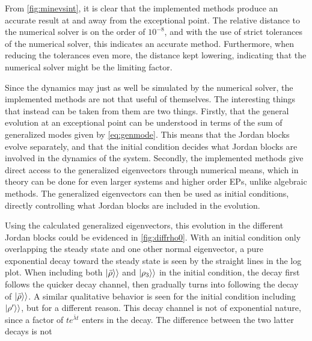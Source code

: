 \documentclass[../main.tex]{subfiles}
\begin{document}
From \cref{fig:minevsint}, it is clear that the implemented methods produce an accurate result at and away from the exceptional point. The relative distance to the numerical solver is on the order of $10^{-8}$, and with the use of strict tolerances of the numerical solver, this indicates an accurate method. Furthermore, when reducing the tolerances even more, the distance kept lowering, indicating that the numerical solver might be the limiting factor.

Since the dynamics may just as well be simulated by the numerical solver, the implemented methods are not that useful of themselves. The interesting things that instead can be taken from them are two things. Firstly, that the general evolution at an exceptional point can be understood in terms of the sum of generalized modes given by \cref{eq:genmode}. This means that the Jordan blocks evolve separately, and that the initial condition decides what Jordan blocks are involved in the dynamics of the system. Secondly, the implemented methods give direct access to the generalized eigenvectors through numerical means, which in theory can be done for even larger systems and higher order EPs, unlike algebraic methods. The generalized eigenvectors can then be used as initial conditions, directly controlling what Jordan blocks are included in the evolution.

Using the calculated generalized eigenvectors, this evolution in the different Jordan blocks could be evidenced in \cref{fig:diffrho0}. With an initial condition only overlapping the steady state and one other normal eigenvector, a pure exponential decay toward the steady state is seen by the straight lines in the log plot. When including both $\ket{\bar \rho}\rangle$ and $\ket{\rho_3}\rangle$ in the initial condition, the decay first follows the quicker decay channel, then gradually turns into following the decay of $\ket{\bar\rho}\rangle$. A similar qualitative behavior is seen for the initial condition including $\ket{\rho'}\rangle$, but for a different reason. This decay channel is not of exponential nature, since a factor of $te^{\bar\lambda t}$ enters in the decay. The difference between the two latter decays is not 
\end{document}
